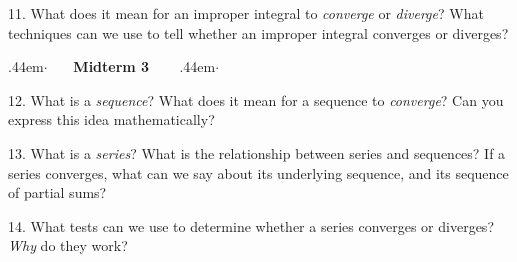 \documentclass[10pt]{article}
\makeatletter
\newcommand\cdotfill{%
    \leavevmode\cleaders\hb@xt@.44em{\hss$\cdot$\hss}\hfill\kern\z@
}
\makeatother
\begin{document}
	\vspace{0.1\textheight}
	11. What does it mean for an improper integral to \textit{converge} or \textit{diverge}? What techniques can we use to tell whether an improper integral converges or diverges?
	
	\vspace{0.1\textheight}
	\cdotfill \ \ \ \textbf{Midterm 3} \ \ \ \cdotfill
	
	\vspace{2em}
	12. What is a \textit{sequence}? What does it mean for a sequence to \textit{converge}? Can you express this idea mathematically?
	
	\vspace{0.1\textheight}
	13. What is a \textit{series}? What is the relationship between series and sequences? If a series converges, what can we say about its underlying sequence, and its sequence of partial sums?
	
	\vspace{0.1\textheight}
	14. What tests can we use to determine whether a series converges or diverges? \textit{Why} do they work?
\end{document}
